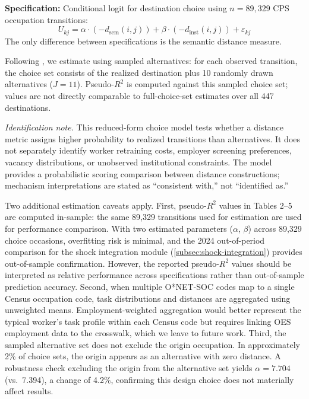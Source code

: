 \documentclass[12pt]{article}
\begin{document}
\textbf{Specification:} Conditional logit for destination choice using $n = 89{,}329$ CPS occupation transitions:
\[
U_{kj} = \alpha \cdot (-d_{\mathrm{sem}}(i,j)) + \beta \cdot (-d_{\mathrm{inst}}(i,j)) + \varepsilon_{kj}
\]
The only difference between specifications is the semantic distance measure.

Following \citet{McFadden1978}, we estimate using sampled alternatives: for each observed transition, the choice set consists of the realized destination plus 10 randomly drawn alternatives ($J = 11$). Pseudo-$R^2$ is computed against this sampled choice set; values are not directly comparable to full-choice-set estimates over all 447 destinations.

\medskip
\noindent\textit{Identification note.} This reduced-form choice model tests whether a distance metric assigns higher probability to realized transitions than alternatives. It does not separately identify worker retraining costs, employer screening preferences, vacancy distributions, or unobserved institutional constraints. The model provides a probabilistic scoring comparison between distance constructions; mechanism interpretations are stated as ``consistent with,'' not ``identified as.''

Two additional estimation caveats apply. First, pseudo-$R^2$ values in Tables 2--5 are computed in-sample: the same 89,329 transitions used for estimation are used for performance comparison. With two estimated parameters ($\alpha$, $\beta$) across 89,329 choice occasions, overfitting risk is minimal, and the 2024 out-of-period comparison for the shock integration module (\cref{subsec:shock-integration}) provides out-of-sample confirmation. However, the reported pseudo-$R^2$ values should be interpreted as relative performance across specifications rather than out-of-sample prediction accuracy. Second, when multiple O*NET-SOC codes map to a single Census occupation code, task distributions and distances are aggregated using unweighted means. Employment-weighted aggregation would better represent the typical worker's task profile within each Census code but requires linking OES employment data to the crosswalk, which we leave to future work. Third, the sampled alternative set does not exclude the origin occupation. In approximately 2\% of choice sets, the origin appears as an alternative with zero distance. A robustness check excluding the origin from the alternative set yields $\alpha = 7.704$ (vs.\ 7.394), a change of 4.2\%, confirming this design choice does not materially affect results.
\end{document}
